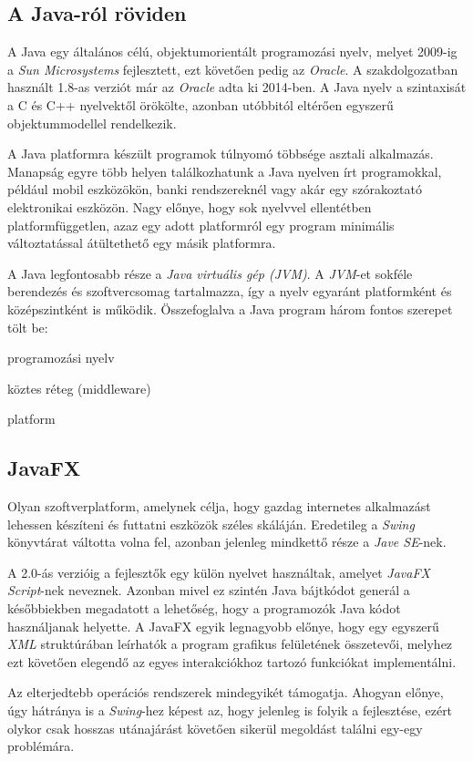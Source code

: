 \documentclass{elteikthesis}
\begin{document}
\subsection{A Java-ról röviden}
A Java egy általános célú, objektumorientált programozási nyelv, melyet 2009-ig a \emph{Sun Microsystems} fejlesztett, ezt követően pedig az \emph{Oracle}. A szakdolgozatban használt 1.8-as verziót már az \emph{Oracle} adta ki 2014-ben. A Java nyelv a szintaxisát a C és C++ nyelvektől örökölte, azonban utóbbitól eltérően egyszerű objektummodellel rendelkezik. \par
 A Java platformra készült programok túlnyomó többsége asztali alkalmazás. Manapság egyre több helyen találkozhatunk a Java nyelven írt programokkal, például mobil eszközökön, banki rendszereknél vagy akár egy szórakoztató elektronikai eszközön. Nagy előnye, hogy sok nyelvvel ellentétben platformfüggetlen, azaz egy adott platformról egy program minimális változtatással átültethető egy másik platformra. \par
 A Java legfontosabb része a \emph{Java virtuális gép (JVM)}. A \emph{JVM}-et sokféle berendezés és szoftvercsomag tartalmazza, így a nyelv egyaránt platformként és középszintként is működik.
Összefoglalva a Java program három fontos szerepet tölt be:
\begin{description}[0.5cm]
\item[$\bullet$] programozási nyelv
\item[$\bullet$] köztes réteg (middleware)
\item[$\bullet$] platform
\end{description}

\subsection{JavaFX}
Olyan szoftverplatform, amelynek célja, hogy gazdag internetes alkalmazást lehessen készíteni és futtatni eszközök széles skáláján. Eredetileg a \emph{Swing} könyvtárat váltotta volna fel, azonban jelenleg mindkettő része a \emph{Jave SE}-nek. \par
 A 2.0-ás verzióig a fejlesztők egy külön nyelvet használtak, amelyet \emph{JavaFX Script}-nek neveznek. Azonban mivel ez szintén Java bájtkódot generál a későbbiekben megadatott a lehetőség, hogy a programozók Java kódot használjanak helyette. A JavaFX egyik legnagyobb előnye, hogy egy egyszerű \emph{XML} struktúrában leírhatók a program grafikus felületének összetevői, melyhez ezt követően elegendő az egyes interakciókhoz tartozó funkciókat implementálni.\par Az elterjedtebb operációs rendszerek mindegyikét támogatja. Ahogyan előnye, úgy hátránya is a \emph{Swing}-hez képest az, hogy jelenleg is folyik a fejlesztése, ezért olykor csak hosszas utánajárást követően sikerül megoldást találni egy-egy problémára.
\end{document}
